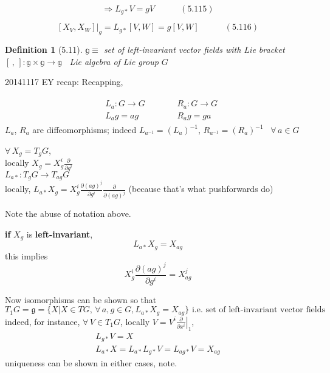 \documentclass{book}
\newtheorem{definition}{Definition}
\begin{document}
\begin{equation}
  \Longrightarrow L_{g*}V = gV \quad \quad \quad (5.115) 
\end{equation}

\begin{equation}
  \left. [ X_V, X_W ] \right|_g = L_{g*}[V,W] = g[V,W] \quad \quad \quad (5.116)
\end{equation}


\begin{definition}[5.11]
  $\mathbb{g} \equiv $ set of left-invariant vector fields with Lie bracket $[ \, , \, ] : \mathbb{g} \times \mathbb{g} \to \mathbb{g}$  \quad \, Lie algebra of Lie group $G$
\end{definition}

\hrulefill

20141117 EY recap: Recapping,

\[
\begin{gathered}
  \begin{aligned}
    & L_a : G \to G \\
    & L_a g = ag \end{aligned} \quad \quad \, \begin{aligned}
    & R_a : G \to G \\ 
    & R_a g = ga \end{aligned}
\end{gathered}
\]
$L_a$, $R_a$ are diffeomorphisms; indeed $L_{a^{-1}} = (L_a)^{-1}$, $R_{a^{-1}} = (R_a)^{-1}$ \quad \, $\forall \, a \in G$

$\forall \, X_g = T_gG$, \\
locally $X_g = X_g^i \frac{ \partial }{ \partial g^i }$ \\

$L_{a*} : T_gG \to T_{ag}G$ \\
locally, $L_{a*} X_g = X^i_g \frac{ \partial (ag)^j}{ \partial g^i} \frac{ \partial}{ \partial (ag)^j}$ (because that's what pushforwards do) 

Note the abuse of notation above.

\textbf{if} $X_g$ is \textbf{left-invariant}, 
\[
L_{a*} X_g = X_{ag}
\] 
this implies
\[
X^i_g \frac{ \partial (ag)^j}{ \partial g^i} = X^j_{ag}
\]

Now isomorphisms can be shown so that
\[
T_1G = \mathfrak{g} = \lbrace X | X \in TG, \, \forall \, a,g \in G, L_{a*} X_g = X_{ag} \rbrace \text{ i.e. set of left-invariant vector fields}
\]
indeed, for instance, $\forall \, V \in T_1G$, locally $V  = V^i \left. \frac{ \partial }{ \partial x^i} \right|_1$, 
\[
\begin{gathered}
  L_{g*} V = X \\ 
  L_{a*}X = L_{a*} L_{g*} V = L_{ag*} V = X_{ag}
\end{gathered}
\]
uniqueness can be shown in either cases, note. 
\end{document}
